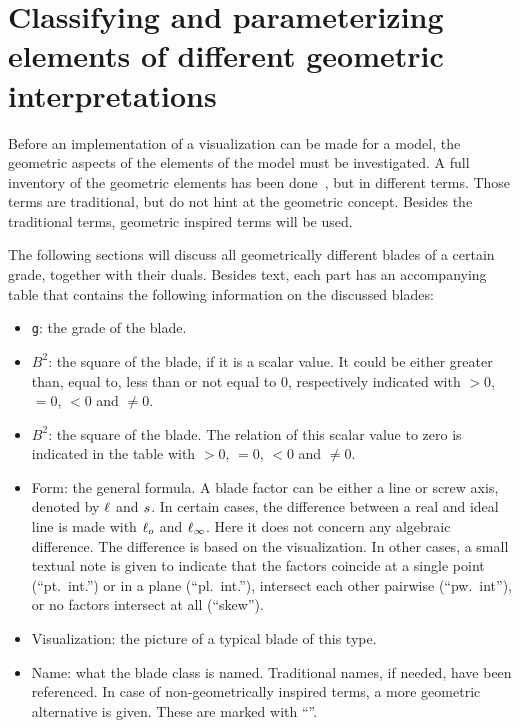 \section{Classifying and parameterizing elements of different geometric interpretations}
\label{ch:research}

Before an implementation of a visualization can be made for a model, the geometric aspects of the elements of the model must be investigated.  A full inventory of the geometric elements has been done~\cite[Chapter 3]{Pottmann}, but in different terms.  Those terms are traditional, but do not hint at the geometric concept.  Besides the traditional terms, geometric inspired terms will be used.  

The following sections will discuss all geometrically different blades of a certain grade, together with their duals.  Besides text, each part has an accompanying table that contains the following information on the discussed blades:
\begin{itemize}
  \item \texttt{g}: the grade of the blade.
  \item $B^2$: the square of the blade, if it is a scalar value.  It could be either greater than, equal to, less than or not equal to 0, respectively indicated with $> 0$, $= 0$, $< 0$ and $\not= 0$.
  \item $B^2$: the square of the blade.  The relation of this scalar value to zero is indicated in the table with $> 0$, $= 0$, $< 0$ and $\not= 0$.
  \item Form: the general formula.  A blade factor can be either a line or screw axis, denoted by $\ell$ and $s$.  In certain cases, the difference between a real and ideal line is made with $\ell_o$ and $\ell_\infty$.  Here it does not concern any algebraic difference.  The difference is based on the visualization.  In other cases, a small textual note is given to indicate that the factors coincide at a single point (``pt.\ int.'') or in a plane (``pl.\ int.''), intersect each other pairwise (``pw.\ int''), or no factors intersect at all (``skew'').
  \item Visualization: the picture of a typical blade of this type.
  \item Name: what the blade class is named.  Traditional names, if needed, have been referenced.  In case of non-geometrically inspired terms, a more geometric alternative is given.  These are marked with ``\newterm''.
\end{itemize}

